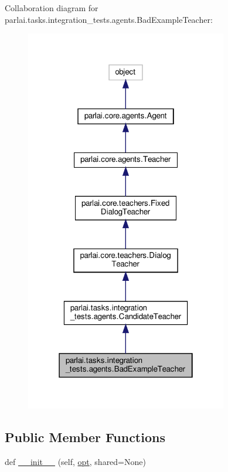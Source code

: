 Collaboration diagram for parlai.\+tasks.\+integration\+\_\+tests.\+agents.\+Bad\+Example\+Teacher\+:
\nopagebreak
\begin{figure}[H]
\begin{center}
\leavevmode
\includegraphics[width=250pt]{classparlai_1_1tasks_1_1integration__tests_1_1agents_1_1BadExampleTeacher__coll__graph}
\end{center}
\end{figure}
\subsection*{Public Member Functions}
\begin{DoxyCompactItemize}
\item 
def \hyperlink{classparlai_1_1tasks_1_1integration__tests_1_1agents_1_1BadExampleTeacher_a977f478a2379e0f40525f3dd5408a87c}{\+\_\+\+\_\+init\+\_\+\+\_\+} (self, \hyperlink{classparlai_1_1tasks_1_1integration__tests_1_1agents_1_1CandidateTeacher_abd333c4cd21fdfb819cae9fe9d56c78c}{opt}, shared=None)
\end{DoxyCompactItemize}
